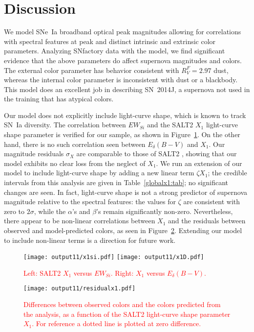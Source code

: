 \documentclass{aastex61}   	%
\begin{document}
\section{Discussion}
\label{discussion:sec}
We model SNe~Ia broadband optical peak magnitudes allowing for correlations with spectral features at peak and distinct intrinsic and
extrinsic color parameters.  Analyzing SNfactory data with the model, we find significant evidence that the above parameters do
affect supernova magnitudes and colors.  The external color parameter has behavior consistent with  $R^F_V=2.97$ \citet{1999PASP..111...63F} dust,
whereas the internal color parameter is inconsistent with dust or a blackbody.  This model  does an excellent job in
describing SN~2014J, a supernova not used in the training that has atypical colors.

\color{red}
Our model does not explicitly include light-curve shape, which is known to track SN~Ia diversity.
The correlation between $EW_{Si}$ and the SALT2 $X_1$ light-curve shape parameter is verified
for our sample, as shown in Figure~\ref{x1:fig}.
On the other hand, there is no such correlation seen between $E_\delta(B-V)$ and $X_1$. 
Our magnitude residuals $\sigma_X$ are comparable to those of SALT2
\citep{2010A&A...523A...7G}, showing that our model exhibits no clear loss from the neglect of $X_1$.
We  run an extension of our model to include light-curve shape by adding a new linear term $\zeta X_1$; the credible intervals
from this analysis are given in Table~\ref{globalx1:tab}; no significant changes are seen. 
In fact, light-curve shape is not a strong predictor of supernova magnitude relative to the spectral features: the values
for
$\zeta$ are consistent with zero to $2\sigma$, while the $\alpha$'s and $\beta$'s remain significantly
non-zero.  
Nevertheless, there 
appear to be non-linear correlations 
between $X_1$ and the residuals between observed and model-predicted colors, as seen in
Figure~\ref{x1res:fig}.
Extending our model to include non-linear terms is a direction for future work.
\begin{figure}[htbp] %
   \centering
   \texttt{[image: output11/x1si.pdf]}
   \texttt{[image: output11/x1D.pdf]}
    \caption{\textcolor{red}{Left: SALT2 $X_1$ versus $EW_{Si}$.  Right: $X_1$ versus $E_\delta(B-V)$.}
   \label{x1:fig}}
\end{figure}

\begin{figure}[htbp] %
   \centering
   \texttt{[image: output11/residualx1.pdf]}
    \caption{\textcolor{red}{Differences between observed colors and the colors predicted from the analysis, as a function
            of the SALT2 light-curve shape parameter $X_1$.  For reference a dotted line is plotted at zero difference.}
   \label{x1res:fig}}
\end{figure}
\end{document}
